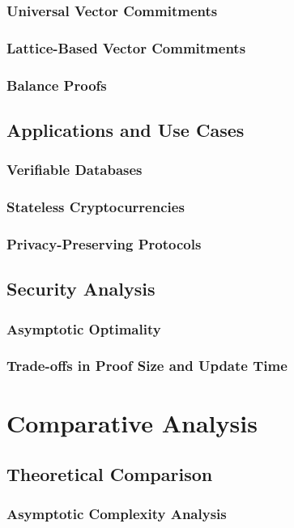 \documentclass{iacrcc}
\begin{document}
\subsubsection{Universal Vector Commitments}
\subsubsection{Lattice-Based Vector Commitments}
\subsubsection{Balance Proofs}
\subsection{Applications and Use Cases}
\subsubsection{Verifiable Databases}
\subsubsection{Stateless Cryptocurrencies}
\subsubsection{Privacy-Preserving Protocols}
\subsection{Security Analysis}
\subsubsection{Asymptotic Optimality}
\subsubsection{Trade-offs in Proof Size and Update Time}

\section{Comparative Analysis}
\subsection{Theoretical Comparison}
\subsubsection{Asymptotic Complexity Analysis}
\end{document}
